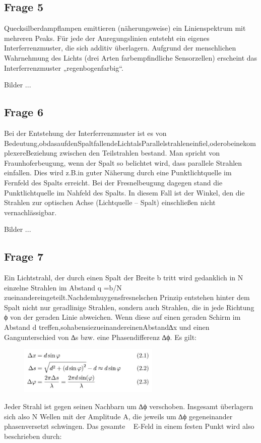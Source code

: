 \documentclass[a4paper,10pt]{scrartcl}
\begin{document}
		\subsection{Frage 5}
		Quecksilberdampﬂampen emittieren (näherungsweise) ein Linienspektrum mit mehreren Peaks. Für jede der Anregungslinien entsteht ein eigenes Interferrenzmuster, die sich additiv überlagern. Aufgrund der menschlichen Wahrnehmung des Lichts (drei Arten farbempﬁndliche Sensorzellen) erscheint das Interferrenzmuster „regenbogenfarbig“.

Bilder ...
		\subsection{Frage 6}
		Bei der Entstehung der Interferrenzmuster ist es von Bedeutung,obdasaufdenSpaltfallendeLichtalsParallelstrahleneinﬁel,oderobeinekomplexereBeziehung zwischen den Teilstrahlen bestand.
Man spricht von Fraunhoferbeugung, wenn der Spalt so belichtet wird, dass parallele Strahlen einfallen. Dies wird z.B.in guter Näherung durch eine Punktlichtquelle im Fernfeld des Spalts erreicht. Bei der Fresnelbeugung dagegen stand die Punktlichtquelle im Nahfeld des Spalts. In diesem Fall ist der Winkel, den die Strahlen zur optischen Achse (Lichtquelle – Spalt) einschließen nicht vernachlässigbar.

Bilder ...
			
							 			\subsection{Frage 7}
Ein Lichtstrahl, der durch einen Spalt der Breite b tritt wird gedanklich in N einzelne Strahlen im Abstand q =b/N zueinandereingeteilt.Nachdemhuygensfresnelschen Prinzip entstehen hinter dem Spalt nicht nur geradlinige Strahlen, sondern auch Strahlen, die in jede Richtung ϕ von der geraden Linie abweichen. Wenn diese auf einen geraden Schirm im Abstand d treﬀen,sohabensiezueinandereinenAbstand∆x und einen Gangunterschied von ∆s bzw. eine Phasendiﬀerenz ∆ϕ. Es gilt:

	\FloatBarrier
			\begin{figure}[h]
\centering
\includegraphics[width=0.6\textwidth]{./Bilder/lb03}

\end{figure}
\FloatBarrier
Jeder Strahl ist gegen seinen Nachbarn um ∆ϕ verschoben. Insgesamt überlagern sich also N Wellen mit der Amplitude A, die jeweils um ∆ϕ gegeneinander phasenversetzt schwingen. Das gesamte ~ E-Feld in einem festen Punkt wird also beschrieben durch:
\end{document}
